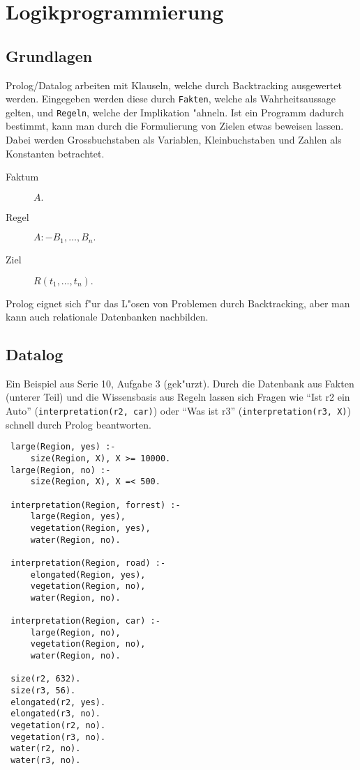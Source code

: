\documentclass[11pt, a4paper,twocolumn]{scrartcl}
\begin{document}
\section{Logikprogrammierung}

\subsection{Grundlagen}

Prolog/Datalog arbeiten mit Klauseln, welche durch Backtracking ausgewertet werden. Eingegeben werden diese durch \texttt{Fakten}, welche als Wahrheitsaussage gelten, und \texttt{Regeln}, welche der Implikation "ahneln. Ist ein Programm dadurch bestimmt, kann man durch die Formulierung von Zielen etwas beweisen lassen. Dabei werden Grossbuchstaben als Variablen, Kleinbuchstaben und Zahlen als Konstanten betrachtet.
\begin{description}
 \item[Faktum] $A.$
 \item[Regel] $A :- B_1, \ldots, B_n.$
 \item[Ziel] $R(t_1, \ldots, t_n).$
\end{description}
Prolog eignet sich f"ur das L"osen von Problemen durch Backtracking, aber man kann auch relationale Datenbanken nachbilden.
                                                                                                                                               
\subsection{Datalog}
Ein Beispiel aus Serie 10, Aufgabe 3 (gek"urzt). Durch die Datenbank aus Fakten (unterer Teil) und die Wissensbasis aus Regeln lassen sich Fragen wie ``Ist r2 ein Auto'' (\texttt{interpretation(r2, car)}) oder ``Was ist r3'' (\texttt{interpretation(r3, X)}) schnell durch Prolog beantworten.
\begin{verbatim}
 large(Region, yes) :-
     size(Region, X), X >= 10000.
 large(Region, no) :- 
     size(Region, X), X =< 500.
 
 interpretation(Region, forrest) :-
     large(Region, yes),
     vegetation(Region, yes),
     water(Region, no).
 
 interpretation(Region, road) :-
     elongated(Region, yes),
     vegetation(Region, no),
     water(Region, no).
				 
 interpretation(Region, car) :-
     large(Region, no),
     vegetation(Region, no),
     water(Region, no).
				 
 size(r2, 632). 
 size(r3, 56).
 elongated(r2, yes). 
 elongated(r3, no).
 vegetation(r2, no). 
 vegetation(r3, no).
 water(r2, no).
 water(r3, no). 
\end{verbatim}
\end{document}
